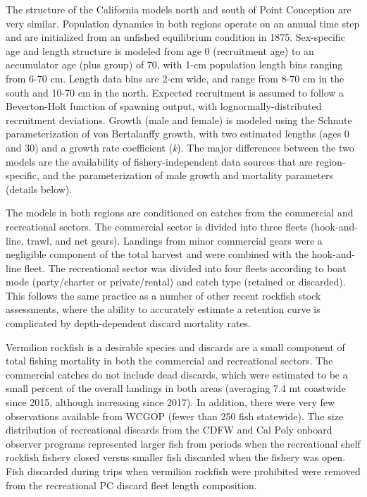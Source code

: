 \documentclass[11pt,
  english,
]{article}
\begin{document}
The structure of the California models north and south of Point Conception are very similar. Population dynamics in both regions operate on an annual time step and are initialized from an unfished equilibrium condition in 1875. Sex-specific age and length structure is modeled from age 0 (recruitment age) to an accumulator age (plus group) of 70, with 1-cm population length bins ranging from 6-70 cm. Length data bins are 2-cm wide, and range from 8-70 cm in the south and 10-70 cm in the north. Expected recruitment is assumed to follow a Beverton-Holt function of spawning output, with lognormally-distributed recruitment deviations. Growth (male and female) is modeled using the Schnute parameterization of von Bertalanffy growth, with two estimated lengths (ages 0 and 30) and a growth rate coefficient (\emph{k}). The major differences between the two models are the availability of fishery-independent data sources that are region-specific, and the parameterization of male growth and mortality parameters (details below).

The models in both regions are conditioned on catches from the commercial and recreational sectors. The commercial sector is divided into three fleets (hook-and-line, trawl, and net gears). Landings from minor commercial gears were a negligible component of the total harvest and were combined with the hook-and-line fleet. The recreational sector was divided into four fleets according to boat mode (party/charter or private/rental) and catch type (retained or discarded). This follows the same practice as a number of other recent rockfish stock assessments, where the ability to accurately estimate a retention curve is complicated by depth-dependent discard mortality rates.

Vermilion rockfish is a desirable species and discards are a small component of total fishing mortality in both the commercial and recreational sectors. The commercial catches do not include dead discards, which were estimated to be a small percent of the overall landings in both areas (averaging 7.4 mt coastwide since 2015, although increasing since 2017). In addition, there were very few observations available from WCGOP (fewer than 250 fish statewide). The size distribution of recreational discards from the CDFW and Cal Poly onboard observer programs represented larger fish from periods when the recreational shelf rockfish fishery closed versus smaller fish discarded when the fishery was open. Fish discarded during trips when vermilion rockfish were prohibited were removed from the recreational PC discard fleet length composition.
\end{document}
